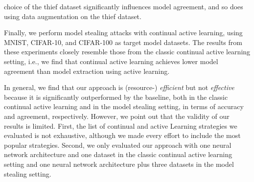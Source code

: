 choice of the thief dataset significantly influences model agreement, and so does using data augmentation on the thief dataset. \par
Finally, we perform model stealing attacks with continual active learning, using MNIST, CIFAR-10, and CIFAR-100 as target model datasets.
The results from these experiments closely resemble those from the classic continual active learning setting, i.e., we find that continual
active learning achieves lower model agreement than model extraction using active learning. \par
In general, we find that our approach is (resource-) \textit{efficient} but not \textit{effective} because it is significantly outperformed
by the baseline, both in the classic continual active learning and in the model stealing setting, in terms of accuracy and agreement,
respectively. However, we point out that the validity of our results is limited. First, the list of continual and active Learning
strategies we evaluated is not exhaustive, although we made every effort to include the most popular strategies. Second, we only evaluated our
approach with one neural network architecture and one dataset in the classic continual active learning setting and one neural network architecture
plus three datasets in the model stealing setting.
